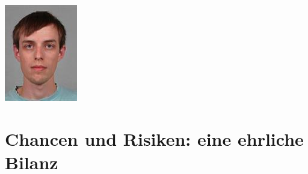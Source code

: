 \begin{minipage}{0.3\textwidth}\raggedright
	\includegraphics[width=\textwidth]{images/team/fhauser}
\end{minipage}

\clearpage
\section{Chancen und Risiken: eine ehrliche Bilanz}

